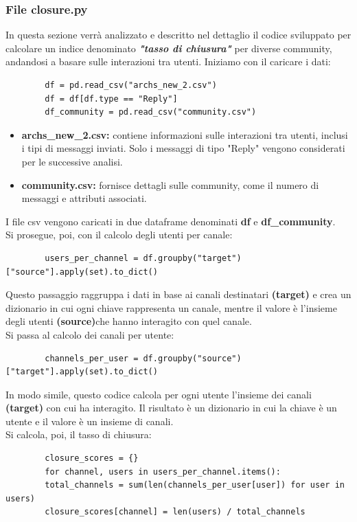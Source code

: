 \documentclass[12pt]{article}
\begin{document}
	\subsubsection{File closure.py}
	In questa sezione verrà analizzato e descritto nel dettaglio il codice sviluppato per calcolare un indice denominato \textit{\textbf{"tasso di chiusura"}} per diverse community, andandosi a basare sulle interazioni tra utenti.
	Iniziamo con il caricare i dati:
	\begin{lstlisting}
		df = pd.read_csv("archs_new_2.csv")
		df = df[df.type == "Reply"]
		df_community = pd.read_csv("community.csv")
	\end{lstlisting}
	\begin{itemize}[label=]
		\item \textbf{archs\_new\_2.csv:} contiene informazioni sulle interazioni tra utenti, inclusi i tipi di messaggi inviati. Solo i messaggi di tipo "Reply" vengono considerati per le successive analisi.
		\item \textbf{community.csv:} fornisce dettagli sulle community, come il numero di messaggi e attributi associati.
	\end{itemize}
	I file csv vengono caricati in due dataframe denominati \textbf{df} e \textbf{df\_community}.\\
	Si prosegue, poi, con il calcolo degli utenti per canale:
	\begin{lstlisting}
		users_per_channel = df.groupby("target")["source"].apply(set).to_dict()
	\end{lstlisting}
	Questo passaggio raggruppa i dati in base ai canali destinatari \textbf{(target)} e crea un dizionario in cui ogni chiave rappresenta un canale, mentre il valore è l'insieme degli utenti \textbf{(source)}che hanno interagito con quel canale.\\
	Si passa al calcolo dei canali per utente:
	\begin{lstlisting}
		channels_per_user = df.groupby("source")["target"].apply(set).to_dict()
	\end{lstlisting}
	In modo simile, questo codice calcola per ogni utente l'insieme dei canali \textbf{(target)} con cui ha interagito. Il risultato è un dizionario in cui la chiave è un utente e il valore è un insieme di canali.\\
	Si calcola, poi, il tasso di chiusura:
	\begin{lstlisting}
		closure_scores = {}
		for channel, users in users_per_channel.items():
		total_channels = sum(len(channels_per_user[user]) for user in users)
		closure_scores[channel] = len(users) / total_channels
	\end{lstlisting}
\end{document}
